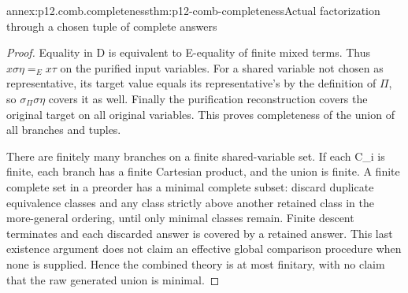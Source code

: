\begin{annexitem}{annex:p12.comb.completeness}{thm:p12-comb-completeness}{Actual factorization through a chosen tuple of complete answers}
\begin{proof}
Equality in D is equivalent to E-equality of finite mixed terms.
Thus \(x\sigma\eta=_Ex\tau\) on the purified input variables.
For a shared variable not chosen as representative, its target
value equals its representative's by the definition of \(\Pi\),
so \(\sigma_\Pi\sigma\eta\) covers it as well. Finally the
purification reconstruction covers the original target on all
original variables. This proves completeness of the union of all
branches and tuples.

There are finitely many branches on a finite shared-variable set.
If each C_i is finite, each branch has a finite Cartesian product,
and the union is finite. A finite complete set in a preorder has
a minimal complete subset: discard duplicate equivalence classes
and any class strictly above another retained class in the
more-general ordering, until only minimal classes remain.
Finite descent terminates and each discarded answer is covered
by a retained answer. This last existence argument does not
claim an effective global comparison procedure when none is supplied.
Hence the combined theory is at most finitary, with no claim that
the raw generated union is minimal.
\end{proof}
\end{annexitem}

